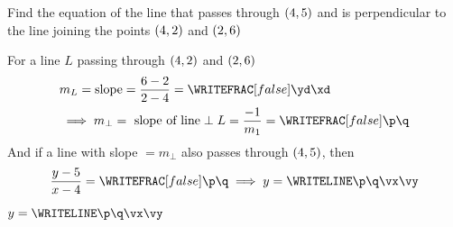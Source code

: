 


\SUBTRACT\vd\vb\yd
\SUBTRACT\vc\va\xd
{}\yd\xd\p\q

\LINEINTERCEPT\ve\vf\p\q\vx\vy

\question[2] Find the equation of the line that passes through $(4,5)$ and 
is perpendicular to the line joining the points $(4,2)$ and $(2, 6)$

\watchout

\begin{solution}[\halfpage]
  For a line $L$  passing through $(4, 2)$ and $(2, 6)$  
	\begin{align}
		& m_L = \text{slope} = \dfrac{\vd - \vb}{\vc - \va} = \WRITEFRAC[false]\yd\xd \\
		& \implies m_{\perp} = \text{ slope of line}\perp L = \dfrac{-1}{m_1} = \WRITEFRAC[false]\p\q
	\end{align}
  And if a line with slope $= m_{\perp}$ also passes through $(4,5)$, then 
  \[ \dfrac{y-\vf}{x-\ve} = \WRITEFRAC[false]\p\q\implies y = \WRITELINE\p\q\vx\vy \] 
\end{solution}

\ifprintanswers
  \begin{codex}
    $y=\WRITELINE\p\q\vx\vy$
  \end{codex}
\fi
